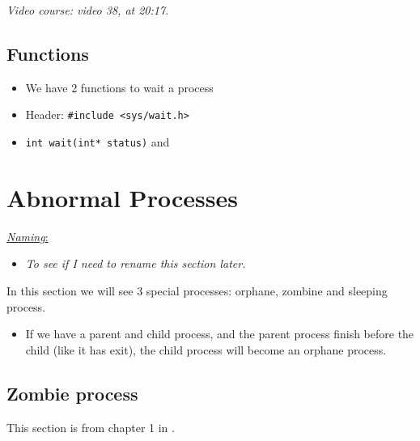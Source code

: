 \documentclass[12pt,a4paper]{book}
\begin{document}
 \textit{Video course: video 38, at 20:17}.

\subsection{Functions}

\begin{itemize}

\item We have 2 functions to wait a process

\item Header: \verb|#include <sys/wait.h>|

\item \verb|int wait(int* status)| and 

\end{itemize}


\newpage
\section{Abnormal Processes}

 \underline{\textit{Naming}:} 


\begin{itemize}

\item \textit{To see if I need to rename this section later.}

\end{itemize}

In this section we will see 3 special processes: orphane, zombine and sleeping process.

\begin{itemize}

\item If we have a parent and child process, and the parent process finish before the child (like it has exit), the child process will become an orphane process.

\end{itemize}


\subsection{Zombie process}

This section is from chapter 1 in  \cite{book_Linux_System_Programming_Robert_Love}.
\end{document}
